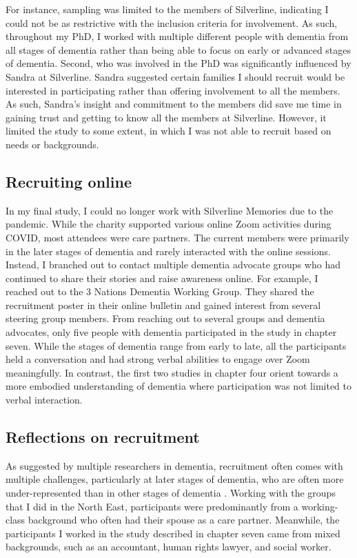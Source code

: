 For instance, sampling was limited to the members of Silverline, indicating I could not be as restrictive with the inclusion criteria for involvement. As such, throughout my PhD, I worked with multiple different people with dementia from all stages of dementia rather than being able to focus on early or advanced stages of dementia. Second, who was involved in the PhD was significantly influenced by Sandra at Silverline. Sandra suggested certain families I should recruit would be interested in participating rather than offering involvement to all the members. As such, Sandra's insight and commitment to the members did save me time in gaining trust and getting to know all the members at Silverline. However, it limited the study to some extent, in which I was not able to recruit based on needs or backgrounds.  

\subsection{Recruiting online}
\label{Method:RecruitOnline}
In my final study, I could no longer work with Silverline Memories due to the pandemic. While the charity supported various online Zoom activities during COVID, most attendees were care partners. The current members were primarily in the later stages of dementia and rarely interacted with the online sessions. Instead, I branched out to contact multiple dementia advocate groups who had continued to share their stories and raise awareness online. For example, I reached out to the 3 Nations Dementia Working Group. They shared the recruitment poster in their online bulletin and gained interest from several steering group members. From reaching out to several groups and dementia advocates, only five people with dementia participated in the study in chapter seven. While the stages of dementia range from early to late, all the participants held a conversation and had strong verbal abilities to engage over Zoom meaningfully. In contrast, the first two studies in chapter four orient towards a more embodied understanding of dementia where participation was not limited to verbal interaction.

\subsection{Reflections on recruitment}
As suggested by multiple researchers in dementia, recruitment often comes with multiple challenges, particularly at later stages of dementia, who are often more under-represented than in other stages of dementia \citep{bartlett2019strategies}. Working with the groups that I did in the North East, participants were predominantly from a working-class background who often had their spouse as a care partner. Meanwhile, the participants I worked in the study described in chapter seven came from mixed backgrounds, such as an accountant, human rights lawyer, and social worker. 

